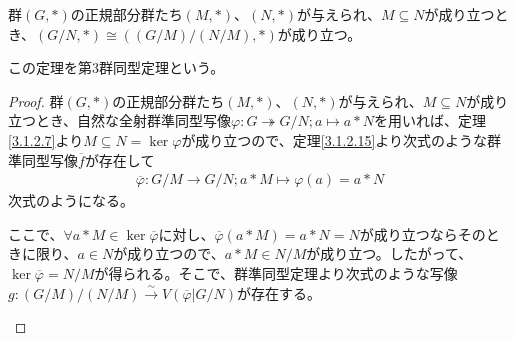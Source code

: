 \documentclass[dvipdfmx]{jsarticle}
\begin{document}
\begin{thm}[第3群同型定理]\label{3.1.2.16}
群$(G,*)$の正規部分群たち$(M,*)$、$(N,*)$が与えられ、$M \subseteq N$が成り立つとき、$\left( {G}/{N},* \right) \cong \left( {\left( {G}/{M} \right)}/{(N/M)},* \right)$が成り立つ。\par
この定理を第3群同型定理という。
\end{thm}
\begin{proof}
群$(G,*)$の正規部分群たち$(M,*)$、$(N,*)$が与えられ、$M \subseteq N$が成り立つとき、自然な全射群準同型写像$\varphi:G \twoheadrightarrow {G}/{N};a \mapsto a*N$を用いれば、定理\ref{3.1.2.7}より$M \subseteq N = \ker\varphi$が成り立つので、定理\ref{3.1.2.15}より次式のような群準同型写像$\overline{f}$が存在して
\begin{align*}
\overline{\varphi}:{G}/{M} \rightarrow {G}/{N};a*M \mapsto \varphi(a) = a*N
\end{align*}
次式のようになる。
\begin{center}
\end{center}
ここで、$\forall a*M \in \ker\overline{\varphi}$に対し、$\overline{\varphi}(a*M) = a*N = N$が成り立つならそのときに限り、$a \in N$が成り立つので、$a*M \in {N}/{M}$が成り立つ。したがって、$\ker\overline{\varphi} = {N}/{M}$が得られる。そこで、群準同型定理より次式のような写像$g:{\left( {G}/{M} \right)}/{\left( {N}/{M} \right)}\overset{\sim}{\rightarrow}V\left( \overline{\varphi}|{G}/{N} \right)$が存在する。
\begin{center}
\end{center}
\end{proof}
\end{document}
